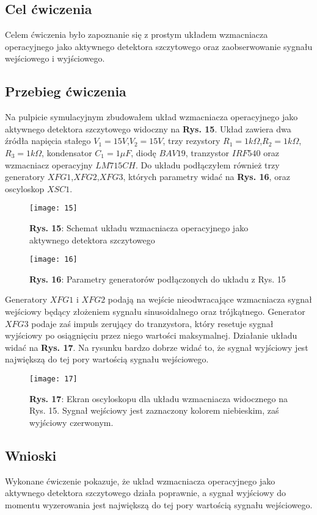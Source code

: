 \documentclass[11pt]{article}
\begin{document}
\subsection{Cel ćwiczenia}
Celem ćwiczenia było zapoznanie się z prostym układem wzmacniacza operacyjnego jako aktywnego detektora szczytowego oraz zaobserwowanie sygnału wejściowego i wyjściowego.
\subsection{Przebieg ćwiczenia}
Na pulpicie symulacyjnym zbudowałem układ wzmacniacza operacyjnego jako aktywnego detektora szczytowego widoczny na \textbf{Rys. 15}. Układ zawiera dwa źródła napięcia stałego $V_1=15V$,$V_2=15V$, trzy rezystory $R_1=1k\Omega$,$R_2=1k\Omega$,$R_3=1k\Omega$, kondensator $C_1=1{\mu}F$, diodę 
$BAV19$, tranzystor $IRF540$ oraz wzmacniacz operacyjny $LM715CH$. Do układu podłączyłem również trzy generatory $XFG1$,$XFG2$,$XFG3$, których parametry widać na \textbf{Rys. 16}, oraz oscyloskop $XSC1$.
\begin{figure}[H]
\centering
\texttt{[image: 15]}
\caption*{\textbf{Rys. 15}: Schemat układu wzmacniacza operacyjnego jako aktywnego detektora szczytowego}
\end{figure}
\begin{figure}[H]
\centering
\texttt{[image: 16]}
\caption*{\textbf{Rys. 16}: Parametry generatorów podłączonych do układu z Rys. 15 }
\end{figure}
\noindent Generatory $XFG1$ i $XFG2$ podają na wejście nieodwracające wzmacniacza sygnał wejściowy będący złożeniem sygnału sinusoidalnego oraz trójkątnego. Generator $XFG3$ podaje zaś impuls zerujący do tranzystora, który resetuje sygnał wyjściowy po osiągnięciu przez niego wartości maksymalnej. Działanie układu
widać na \textbf{Rys. 17}. Na rysunku bardzo dobrze widać to, że sygnał wyjściowy jest największą do tej pory wartością sygnału wejściowego.
\begin{figure}[H]
\centering
\texttt{[image: 17]}
\caption*{\textbf{Rys. 17}: Ekran oscyloskopu dla układu wzmacniacza widocznego na Rys. 15. Sygnał wejściowy jest zaznaczony kolorem niebieskim, zaś wyjściowy czerwonym. }
\end{figure}
\subsection{Wnioski}
Wykonane ćwiczenie pokazuje, że układ wzmacniacza operacyjnego jako aktywnego detektora szczytowego działa poprawnie, a sygnał wyjściowy do momentu wyzerowania jest największą do tej pory wartością sygnału wejściowego.
\end{document}
